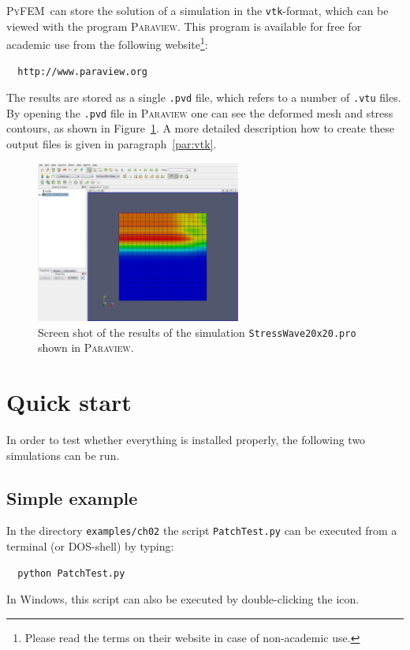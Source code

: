 \documentclass{article}
\newcommand{\progname}{\textsc{PyFEM}}
\begin{document}
\progname~can store the solution of a simulation in the \texttt{vtk}-format, which can be viewed with the 
program \textsc{Paraview}. This program is available for free for academic use from the following 
website\footnote{Please read the terms on their website in case of non-academic use.}:
\begin{verbatim}
  http://www.paraview.org
\end{verbatim} 
The results are stored as a single \texttt{.pvd} file, which refers to a number of \texttt{.vtu} files. By opening
the \texttt{.pvd} file in \textsc{Paraview} one can see the deformed mesh and stress contours, as shown in 
Figure~\ref{fig:stress}. A more detailed description how to create these output files is given in paragraph~\ref{par:vtk}.

\begin{figure}
\centering\includegraphics[width=0.6\textwidth]{img/screen.eps}
\caption{Screen shot of the results of the simulation \texttt{StressWave20x20.pro} shown in \textsc{Paraview}.}
\label{fig:stress}
\end{figure}

\section{Quick start}

In order to test whether everything is installed properly, the following two simulations can be run.

\subsection*{Simple example} 

In the directory \texttt{examples/ch02} the script \texttt{PatchTest.py} can be executed from a terminal (or DOS-shell) by typing:
\begin{verbatim}
  python PatchTest.py
\end{verbatim}
In Windows, this script can also be executed by double-clicking the icon.
\end{document}
